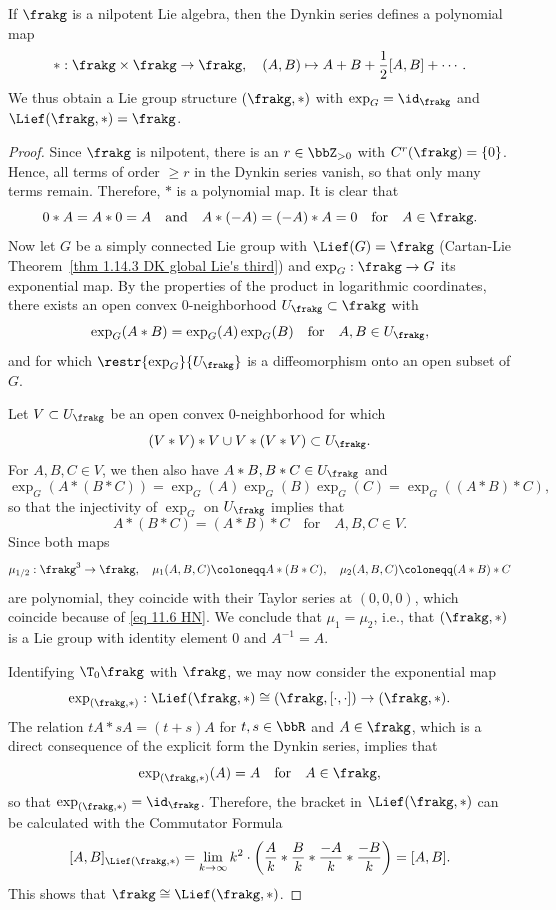 \begin{thm}[{\cite[Thm.~11.2.6]{HN}}]\label{thm 11.2.6 HN}
    If $\frakg$ is a nilpotent Lie algebra, then the Dynkin series defines a polynomial map 
    \[\ast:\frakg\times\frakg\to\frakg,\quad (A,B)\mapsto A+B+\frac12[A,B]+\cdots.\]
    We thus obtain a Lie group structure $(\frakg,\ast)$ with $\exp_G=\id_\frakg$ and $\Lief(\frakg,\ast)=\frakg$.
\end{thm}
\begin{proof}
    Since $\frakg$ is nilpotent, there is an $r\in\bbZ_{>0}$ with $C^r(\frakg)=\{0\}$. Hence, all terms of order $\geq r$ in the Dynkin series vanish, so that only many terms remain. Therefore, $\ast$ is a polynomial map. It is clear that 
    \[0\ast A=A\ast 0=A\quad \text{and}\quad A\ast(-A)=(-A)\ast A=0\quad \text{for}\quad A\in\frakg.\]
    Now let $G$ be a simply connected Lie group with $\Lief(G)=\frakg$ (Cartan-Lie Theorem~\ref{thm 1.14.3 DK global Lie's third}) and $\exp_G:\frakg\to G$ its exponential map. By the properties of the product in logarithmic coordinates, there exists an open convex $0$-neighborhood $U_\frakg\subset\frakg$ with 
    \[\exp_G(A\ast B)=\exp_G(A)\exp_G(B)\quad \text{for}\quad A,B\in U_\frakg,\]
    and for which $\restr{\exp_G}{U_\frakg}$ is a diffeomorphism onto an open subset of $G$.

    Let $V\subset U_\frakg$ be an open convex $0$-neighborhood for which 
    \[(V\ast V)\ast V\cup V\ast(V\ast V)\subset U_\frakg.\]
    For $A,B,C\in V$, we then also have $A\ast B,B\ast C\in U_\frakg$ and 
    \[\exp_G(A\ast(B\ast C))=\exp_G(A)\exp_G(B)\exp_G(C)=\exp_G((A\ast B)\ast C),\]
    so that the injectivity of $\exp_G$ on $U_\frakg$ implies that 
    \[A\ast(B\ast C)=(A\ast B)\ast C\quad \text{for}\quad A,B,C\in V.\label{eq 11.6 HN}\]
    Since both maps 
    \[\mu_{1/2}:\frakg^3\to\frakg,\quad \mu_1(A,B,C)\coloneqq A\ast(B\ast C),\quad \mu_2(A,B,C)\coloneqq (A\ast B)\ast C\]
    are polynomial, they coincide with their Taylor series at $(0,0,0)$, which coincide because of \eqref{eq 11.6 HN}. We conclude that $\mu_1=\mu_2$, i.e., that $(\frakg,\ast)$ is a Lie group with identity element $0$ and $A^{-1}=A$.

    Identifying $\T_0\frakg$ with $\frakg$, we may now consider the exponential map 
    \[\exp_{(\frakg,\ast)}:\Lief(\frakg,\ast)\cong (\frakg,[\cdot,\cdot])\to (\frakg,\ast).\]
    The relation $tA\ast sA=(t+s)A$ for $t,s\in\bbR$ and $A\in\frakg$, which is a direct consequence of the explicit form the Dynkin series, implies that 
    \[\exp_{(\frakg,\ast)}(A)=A\quad \text{for}\quad A\in\frakg,\]
    so that $\exp_{(\frakg,\ast)}=\id_\frakg$. Therefore, the bracket in $\Lief(\frakg,\ast)$ can be calculated with the Commutator Formula 
    \[[A,B]_{\Lief(\frakg,\ast)}=\lim_{k\to\infty}k^2\cdot \left(\frac{A}{k}\ast \frac{B}{k}\ast \frac{-A}{k}\ast\frac{-B}{k}\right)=[A,B].\]
    This shows that $\frakg\cong \Lief(\frakg,\ast)$.
\end{proof}

